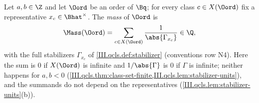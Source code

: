 Let $a,b\in\Z$ and let $\Oord$ be an order of $\Bq$; for every class $c\in X(\Oord)$ fix a representative $x_c\in\Bhat^\times$. The
\emph{mass} of $\Oord$ is
\[
  \Mass(\Oord)=\sum_{c\in X(\Oord)}\frac1{\abs{\Gamma_{x_c}}}\in\Q,
\]
with the full stabilizers $\Gamma_{x_c}$ of \cref{III.qcls.def:stabilizer} (conventions row N4). Here the sum is $0$ if $X(\Oord)$ is infinite and
$1/\abs{\Gamma}$ is $0$ if $\Gamma$ is infinite; neither happens for $a,b<0$ (\cref{III.qcls.thm:class-set-finite,III.qcls.lem:stabilizer-units}),
and the summands do not depend on the representatives (\cref{III.qcls.lem:stabilizer-units}(b)).

